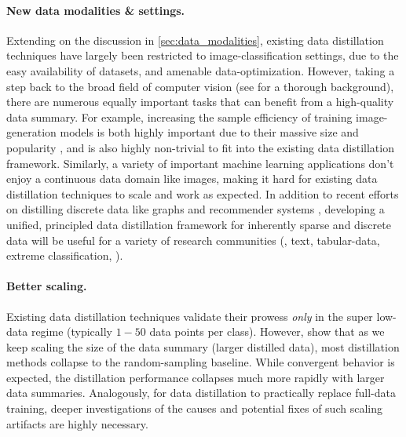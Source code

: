 \documentclass[10pt]{article} %
\begin{document}
\paragraph{New data modalities \& settings.} Extending on the discussion in \cref{sec:data_modalities}, existing data distillation techniques have largely been restricted to image-classification settings, due to the easy availability of datasets, and amenable data-optimization. However, taking a step back to the broad field of computer vision (see \citet{cv_book} for a thorough background), there are numerous equally important tasks that can benefit from a high-quality data summary. 
For example, increasing the sample efficiency of training image-generation models is both highly important due to their massive size and popularity \citep{dalle, stable_diffusion}, and is also highly non-trivial to fit into the existing data distillation framework. Similarly, a variety of important machine learning applications don't enjoy a continuous data domain like images, making it hard for existing data distillation techniques to scale and work as expected. In addition to recent efforts on distilling discrete data like graphs \citep{graph_distill_kdd_22, graph_distill_iclr_22} and recommender systems \citep{inf_ae}, developing a unified, principled data distillation framework for inherently sparse and discrete data will be useful for a variety of research communities (\eg, text, tabular-data, extreme classification, \etc).

\paragraph{Better scaling.} Existing data distillation techniques validate their prowess \emph{only} in the super low-data regime (typically $1-50$ data points per class). However, \citet{dc_bench} show that as we keep scaling the size of the data summary (larger distilled data), most distillation methods collapse to the random-sampling baseline. While convergent behavior is expected, the distillation performance collapses much more rapidly with larger data summaries. Analogously, for data distillation to practically replace full-data training, deeper investigations of the causes and potential fixes of such scaling artifacts are highly necessary.
\end{document}
